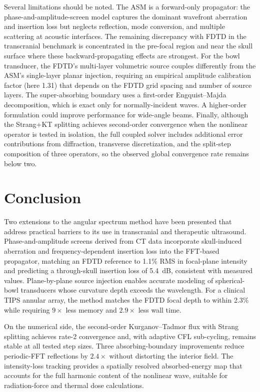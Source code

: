 \documentclass[11pt]{article}
\begin{document}
Several limitations should be noted.  The ASM is a forward-only
propagator: the phase-and-amplitude-screen model captures the dominant
wavefront aberration and insertion loss but neglects reflection, mode
conversion, and multiple scattering at acoustic interfaces.  The
remaining discrepancy with FDTD in the transcranial benchmark is
concentrated in the pre-focal region and near the skull surface where
these backward-propagating effects are strongest.  For the bowl
transducer, the FDTD's multi-layer volumetric source couples
differently from the ASM's single-layer planar injection, requiring an
empirical amplitude calibration factor (here 1.31) that depends on the
FDTD grid spacing and number of source layers.  The super-absorbing
boundary uses a first-order Engquist--Majda decomposition, which is
exact only for normally-incident waves. A higher-order formulation
\cite{higdon1986} could improve performance for wide-angle beams.
Finally, although the Strang+KT splitting achieves second-order
convergence when the nonlinear operator is tested in isolation, the
full coupled solver includes additional error contributions from
diffraction, transverse discretization, and the split-step composition
of three operators, so the observed global convergence rate remains
below two.

\section{Conclusion}
\label{sec:conclusion}

Two extensions to the angular spectrum method have been presented that
address practical barriers to its use in transcranial and therapeutic
ultrasound.  Phase-and-amplitude screens derived from CT data
incorporate skull-induced aberration and frequency-dependent insertion
loss into the FFT-based propagator, matching an FDTD reference to
1.1\% RMS in focal-plane intensity and predicting a through-skull
insertion loss of \SI{5.4}{\deci\bel}, consistent with measured
values.  Plane-by-plane source injection enables accurate modeling of
spherical-bowl transducers whose curvature depth exceeds the
wavelength. For a clinical TIPS annular array, the method matches the
FDTD focal depth to within 2.3\% while requiring $9\times$ less
memory and $2.9\times$ less wall time.

On the numerical side, the second-order Kurganov--Tadmor flux with
Strang splitting achieves rate-2 convergence and, with adaptive CFL
sub-cycling, remains stable at all tested step sizes.  Three
absorbing-boundary improvements reduce periodic-FFT reflections by
$2.4\times$ without distorting the interior field.  The intensity-loss
tracking provides a spatially resolved absorbed-energy map that
accounts for the full harmonic content of the nonlinear wave, suitable
for radiation-force and thermal dose calculations.
\end{document}
